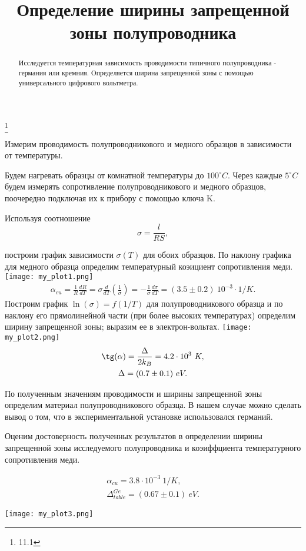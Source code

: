 


\title{Определение ширины запрещенной зоны полупроводника}
\thanks{11.1}



\begin{abstract}
Исследуется температурная зависимость проводимости типичного полупроводника - германия или кремния. Определяется ширина запрещенной зоны с помощью универсального цифрового вольтметра.

\end{abstract}


\maketitle

Измерим проводимость полупроводникового и медного образцов в зависимости от температуры.

Будем нагревать образцы от комнатной температуры до $100^{\circ}C$. Через каждые $5^{\circ}C$ будем измерять сопротивление полупроводникового и медного образцов, поочередно подключая их к прибору с помощью ключа K.

Используя соотношение
$$ \sigma = \frac{l}{RS},$$

построим график зависимости $\sigma(T)$ для обоих образцов. По наклону графика для медного образца определим температурный коэициент сопротивления меди.
\texttt{[image: my\_plot1.png]}
\begin{gather*}
\alpha_{cu} = \frac{1}{R}\frac{dR}{dT} = \sigma\frac{d}{dT}(\frac{1}{\sigma}) = - \frac{1}{\sigma}\frac{d\sigma}{dT} =  (3.5 \pm 0.2)~10^{-3}\cdot 1/K.
\end{gather*}
Построим график $\ln(\sigma) = f(1/T)$ для полупроводникового образца и по наклону его прямолинейной части (при более высоких температурах) определим ширину запрещенной зоны; выразим ее в электрон-вольтах.
\texttt{[image: my\_plot2.png]}
\begin{gather*}
\tg(\alpha) = \frac{\Delta}{2k_B} = 4.2 \cdot 10^{3}~K, \\
\Delta = (0.7 \pm 0.1)~eV.
\end{gather*}

По полученным значениям проводимости и ширины запрещенной зоны определим материал полупроводникового образца. В нашем случае можно сделать вывод о том, что в экспериментальной установке использовался германий.

Оценим достоверность полученных результатов в определении ширины запрещенной зоны исследуемого полупроводника и коэиффциента температурного сопротивления меди.

\begin{gather*}
\alpha_{cu} = 3.8\cdot10^{-3}~1/K, \\
\Delta_{table}^{Ge} = (0.67 \pm 0.1)~eV.
\end{gather*}

\texttt{[image: my\_plot3.png]}

